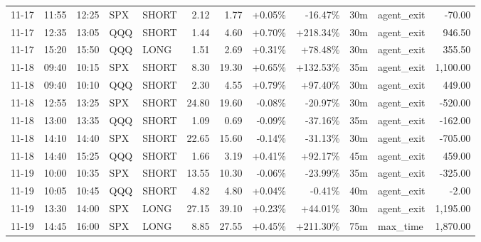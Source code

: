 \documentclass[11pt,a4paper,twoside]{article}
\begin{document}
\begin{center}
\begin{longtable}{>{\color{txtmain}}l l l l l r r r r r >{\color{txtmain}}l r}
11-17 & 11:55 & 12:25 & SPX & SHORT & 2.12 & 1.77 & \textcolor{wingreen}{+0.05\%} & \textcolor{lossred}{-16.47\%} & 30m & agent\_exit & \textcolor{lossred}{-70.00} \\
11-17 & 12:35 & 13:05 & QQQ & SHORT & 1.44 & 4.60 & \textcolor{wingreen}{+0.70\%} & \textcolor{wingreen}{+218.34\%} & 30m & agent\_exit & \textcolor{wingreen}{946.50} \\
11-17 & 15:20 & 15:50 & QQQ & LONG & 1.51 & 2.69 & \textcolor{wingreen}{+0.31\%} & \textcolor{wingreen}{+78.48\%} & 30m & agent\_exit & \textcolor{wingreen}{355.50} \\
11-18 & 09:40 & 10:15 & SPX & SHORT & 8.30 & 19.30 & \textcolor{wingreen}{+0.65\%} & \textcolor{wingreen}{+132.53\%} & 35m & agent\_exit & \textcolor{wingreen}{1,100.00} \\
11-18 & 09:40 & 10:10 & QQQ & SHORT & 2.30 & 4.55 & \textcolor{wingreen}{+0.79\%} & \textcolor{wingreen}{+97.40\%} & 30m & agent\_exit & \textcolor{wingreen}{449.00} \\
11-18 & 12:55 & 13:25 & SPX & SHORT & 24.80 & 19.60 & \textcolor{lossred}{-0.08\%} & \textcolor{lossred}{-20.97\%} & 30m & agent\_exit & \textcolor{lossred}{-520.00} \\
11-18 & 13:00 & 13:35 & QQQ & SHORT & 1.09 & 0.69 & \textcolor{lossred}{-0.09\%} & \textcolor{lossred}{-37.16\%} & 35m & agent\_exit & \textcolor{lossred}{-162.00} \\
11-18 & 14:10 & 14:40 & SPX & SHORT & 22.65 & 15.60 & \textcolor{lossred}{-0.14\%} & \textcolor{lossred}{-31.13\%} & 30m & agent\_exit & \textcolor{lossred}{-705.00} \\
11-18 & 14:40 & 15:25 & QQQ & SHORT & 1.66 & 3.19 & \textcolor{wingreen}{+0.41\%} & \textcolor{wingreen}{+92.17\%} & 45m & agent\_exit & \textcolor{wingreen}{459.00} \\
11-19 & 10:00 & 10:35 & SPX & SHORT & 13.55 & 10.30 & \textcolor{lossred}{-0.06\%} & \textcolor{lossred}{-23.99\%} & 35m & agent\_exit & \textcolor{lossred}{-325.00} \\
11-19 & 10:05 & 10:45 & QQQ & SHORT & 4.82 & 4.80 & \textcolor{wingreen}{+0.04\%} & \textcolor{lossred}{-0.41\%} & 40m & agent\_exit & \textcolor{lossred}{-2.00} \\
11-19 & 13:30 & 14:00 & SPX & LONG & 27.15 & 39.10 & \textcolor{wingreen}{+0.23\%} & \textcolor{wingreen}{+44.01\%} & 30m & agent\_exit & \textcolor{wingreen}{1,195.00} \\
11-19 & 14:45 & 16:00 & SPX & LONG & 8.85 & 27.55 & \textcolor{wingreen}{+0.45\%} & \textcolor{wingreen}{+211.30\%} & 75m & max\_time & \textcolor{wingreen}{1,870.00} \\

\end{longtable}
\end{center}
\end{document}
